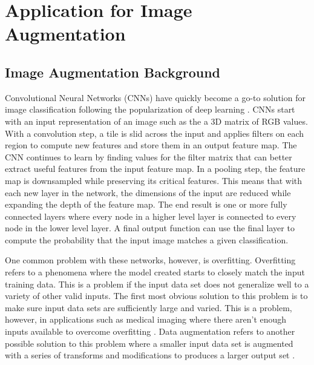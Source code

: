 

\chapter{Application for Image Augmentation}

\section{Image Augmentation Background}

Convolutional Neural Networks (CNNs) have quickly become a go-to solution for image classification following the popularization of deep learning \cite{dataAugment}. CNNs start with an input representation of an image such as the a 3D matrix of RGB values. With a convolution step, a tile is slid across the input and applies filters on each region to compute new features and store them in an output feature map. The CNN continues to learn by finding values for the filter matrix that can better extract useful features from the input feature map. In a pooling step, the feature map is downsampled while preserving its critical features. This means that with each new layer in the network, the dimensions of the input are reduced while expanding the depth of the feature map. The end result is one or more fully connected layers where every node in a higher level layer is connected to every node in the lower level layer. A final output function can use the final layer to compute the probability that the input image matches a given classification.

\quad One common problem with these networks, however, is overfitting. Overfitting refers to a phenomena where the model created starts to closely match the input training data. This is a problem if the input data set does not generalize well to a variety of other valid inputs. The first most obvious solution to this problem is to make sure input data sets are sufficiently large and varied. This is a problem, however, in applications such as medical imaging where there aren't enough inputs available to overcome overfitting \cite{imageAugmentationSurvey}. Data augmentation refers to another possible solution to this problem where a smaller input data set is augmented with a series of transforms and modifications to produces a larger output set \cite{dataAugment, effectivenessDataAugmentation}. 

